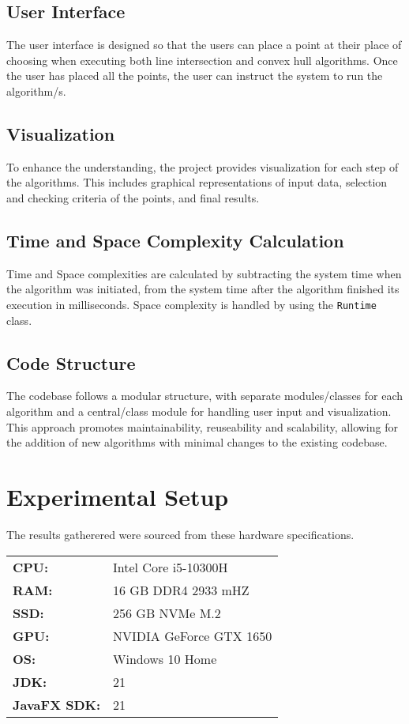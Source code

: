 \documentclass[10pt,twocolumn]{article}
\begin{document}
\subsection*{User Interface}

The user interface is designed so that the users can place a point at their place of choosing when executing both line intersection
and convex hull algorithms. Once the user has placed all the points, the user can instruct the system to run the algorithm/s.

\subsection*{Visualization}

To enhance the understanding, the project provides visualization for each step of the algorithms. This includes graphical representations of input
data, selection and checking criteria of the points, and final results.

\subsection*{Time and Space Complexity Calculation}

Time and Space complexities are calculated by subtracting the system time when the algorithm was initiated, from the system time
after the algorithm finished its execution in milliseconds. Space complexity is handled by using the \texttt{Runtime} class.

\subsection*{Code Structure}

The codebase follows a modular structure, with separate modules/classes for each algorithm and a central/class module for handling user input and visualization.
This approach promotes maintainability, reuseability and scalability, allowing for the addition of new algorithms with minimal changes to the existing codebase.

\section*{Experimental Setup}
The results gatherered were sourced from these hardware specifications.
\begin{tabular}{l l}
    \textbf{CPU:} & Intel Core i5-10300H \\
    \textbf{RAM:} & 16 GB DDR4 2933 mHZ \\
    \textbf{SSD:} & 256 GB NVMe M.2 \\
    \textbf{GPU:} & NVIDIA GeForce GTX 1650 \\
    \textbf{OS:} & Windows 10 Home \\
    \textbf{JDK:} & 21 \\
    \textbf{JavaFX SDK:} & 21 \\
\end{tabular}
\end{document}
